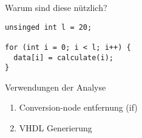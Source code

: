 \begin{frame}[fragile]{Warum sind diese nützlich?}
\begin{lstlisting}
unsinged int l = 20;

for (int i = 0; i < l; i++) {
  data[i] = calculate(i);
}
\end{lstlisting}
\end{frame}


\begin{frame}{Verwendungen der Analyse}
\begin{enumerate}
	\item Conversion-node entfernung (if)
	\item VHDL Generierung
\end{enumerate}
\end{frame}

